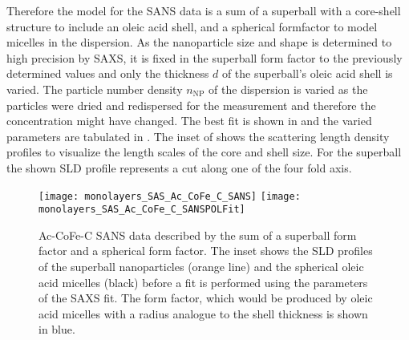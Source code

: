 \documentclass[\main/dresen_thesis.tex]{subfiles}
\begin{document}
    Therefore the model for the SANS data is a sum of a superball with a core-shell structure to include an oleic acid shell, and a spherical formfactor to model micelles in the dispersion.
    As the nanoparticle size and shape is determined to high precision by SAXS, it is fixed in the superball form factor to the previously determined values and only the thickness $d$ of the superball's oleic acid shell is varied.
    The particle number density $n_\mathrm{NP}$ of the dispersion is varied as the particles were dried and redispersed for the measurement and therefore the concentration might have changed.
    The best fit is shown in  and the varied parameters are tabulated in .
    The inset of  shows the scattering length density profiles to visualize the length scales of the core and shell size.
    For the superball the shown SLD profile represents a cut along one of the four fold axis.

    \begin{figure}[tb]
      \centering
      \texttt{[image: monolayers\_SAS\_Ac\_CoFe\_C\_SANS]}
      \texttt{[image: monolayers\_SAS\_Ac\_CoFe\_C\_SANSPOLFit]}
      \caption{\label{fig:monolayers:nanoparticle:sans:superballOAFit}Ac-CoFe-C SANS data described by the sum of a superball form factor and a spherical form factor. The inset shows the SLD profiles of the superball nanoparticles (orange line) and the spherical oleic acid micelles (black) before a fit is performed using the parameters of the SAXS fit. The form factor, which would be produced by oleic acid micelles with a radius analogue to the shell thickness is shown in blue.}
    \end{figure}
\end{document}
